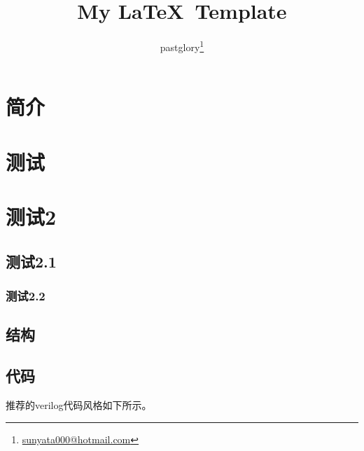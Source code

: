 \documentclass[zh, a4paper, 12pt]{pgreport}
\title {My \LaTeX\ Template}
\author{pastglory\thanks{\href{mailto:sunyata000@hotmail.com}{sunyata000@hotmail.com}}}
\date{}
\begin{document}
\maketitle
\tableofcontents
\begin{abstract}

\end{abstract}

\section{简介}


\section{测试}
\section{测试2}
\subsection{测试2.1}
\subsubsection{测试2.2}

\subsection{结构}


\subsection{代码}
推荐的verilog代码风格如下所示。



\end{document}
